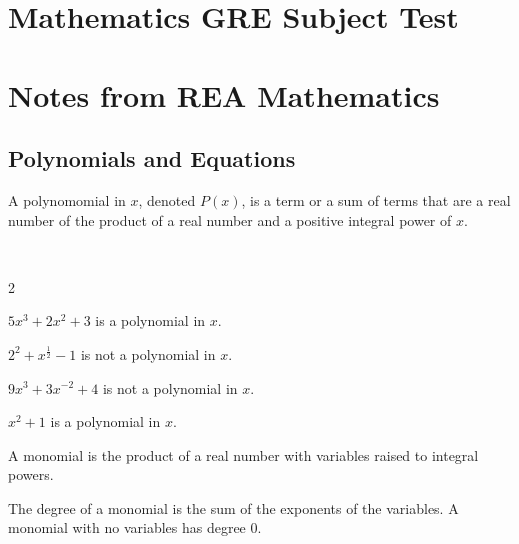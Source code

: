 \documentclass[crop=false,class=article,oneside]{standalone}
\begin{document}
    \ifx\ifcoursesmathgre\undefined
        \section*{Mathematics GRE Subject Test}
        \setcounter{section}{3}
        \renewcommand\thefigure{\arabic{section}.\arabic{figure}}
        \renewcommand\thesubfigure{%
            \arabic{section}.\arabic{figure}.\arabic{subfigure}}
    \else
        \section{Notes from REA Mathematics}
    \fi
    \subsection{Polynomials and Equations}
        \begin{definition}
            A polynomomial in $x$, denoted $P(x)$,
            is a term or
            a sum of terms that are a
            real number of the product
            of a real number and a positive integral power
            of $x$.
        \end{definition}
        \begin{example}
            \
            \begin{enumerate}
            \end{enumerate}
        \end{example}
        \begin{definition}
            A monomial is the product of a real number with
            variables raised to integral powers.
        \end{definition}
        \begin{definition}
            The degree of a monomial is the sum of the exponents
            of the variables. A monomial with no variables has
            degree $0$.
        \end{definition}
\end{document}
